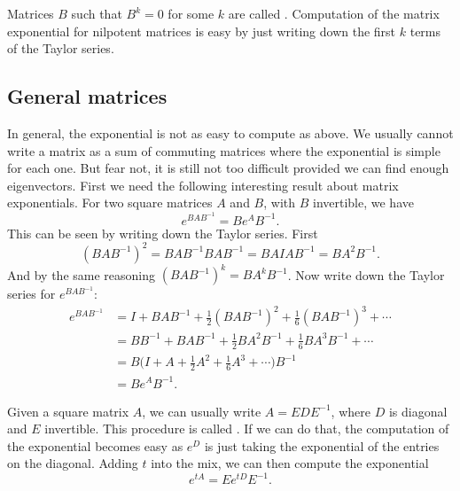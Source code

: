 Matrices $B$ such that $B^k = 0$ for some $k$ are called
\emph{}.  Computation of the matrix exponential for
nilpotent matrices is easy by just writing down the first $k$ terms of
the Taylor series.

\subsection{General matrices}

In general, the exponential is not as easy to compute as above.  We usually
cannot write a matrix as a sum of commuting matrices where the exponential
is simple for each one.  But fear not, it is still not too difficult provided
we can find enough eigenvectors.  First we need the following interesting
result about matrix exponentials.  For two square matrices $A$ and $B$, with
$B$ invertible,
we have
\begin{equation*}
e^{BAB^{-1}} = B e^A B^{-1} .
\end{equation*}
This can be seen by writing down the Taylor series.  First 
\begin{equation*}
{(BAB^{-1})}^2 =
BAB^{-1} BAB^{-1} =
BAIAB^{-1} =
BA^2B^{-1} .
\end{equation*}
And by the same reasoning ${(BAB^{-1})}^k = B A^k B^{-1}$.  Now write 
down the Taylor series for
$e^{BAB^{-1}}$:
\begin{equation*}
\begin{split}
e^{BAB^{-1}} & =
I + {BAB^{-1}} + \frac{1}{2} {(BAB^{-1})}^2 + 
\frac{1}{6} {(BAB^{-1})}^3 + \cdots
\\
& =
BB^{-1} + {BAB^{-1}} + \frac{1}{2} BA^2B^{-1} + 
\frac{1}{6} BA^3B^{-1} + \cdots
\\
& =
B \bigl(
I + A + \frac{1}{2} A^2 + 
\frac{1}{6} A^3 + \cdots \bigr) B^{-1} \\
& = B e^A B^{-1} .
\end{split}
\end{equation*}

Given a square matrix $A$, 
we can usually write $A = E D E^{-1}$, where $D$ is
diagonal and $E$ invertible.
This procedure is called \emph{}.
If we can do
that, the computation  of the
exponential becomes easy as $e^D$ is just taking the exponential of
the entries on the diagonal.  Adding $t$ into the mix, 
we can then compute the exponential
\begin{equation*}
e^{tA} = E e^{tD} E^{-1} .
\end{equation*}

